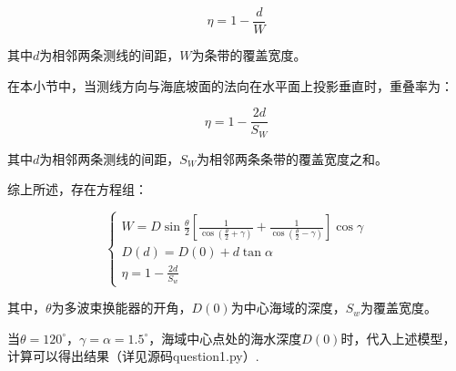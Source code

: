 \begin{equation}
    \eta = 1 - \frac{d}{W}
\end{equation}

其中$d$为相邻两条测线的间距，$W$为条带的覆盖宽度。

在本小节中，当测线方向与海底坡面的法向在水平面上投影垂直时，重叠率为：

\begin{equation}
    \eta = 1-\frac{2d}{S_W}
\end{equation}

其中$d$为相邻两条测线的间距，$S_W$为相邻两条条带的覆盖宽度之和。

综上所述，存在方程组：

\begin{equation}
    \begin{cases}
        W = D \sin\frac{\theta}{2}\left[
            \frac{1}{\cos(\frac{\theta}{2}+\gamma)} +
            \frac{1}{\cos(\frac{\theta}{2}-\gamma)}
        \right] \cos\gamma \\
        D(d) = D(0) + d\tan\alpha \\
        \eta = 1 - \frac{2d}{S_w}
    \end{cases}
\end{equation}

其中，$\theta$为多波束换能器的开角，$D(0)$为中心海域的深度，$S_w$为覆盖宽度。

当$\theta = 120^\circ$，$\gamma=\alpha=1.5^\circ$，海域中心点处的海水深度$D(0)$时，代入上述模型，计算可以得出结果（详见源码question1.py）.

\begin{table}[h]
    \centering
    \caption{\textbf{问题1的计算结果(保留两位小数)}}
\end{table}


